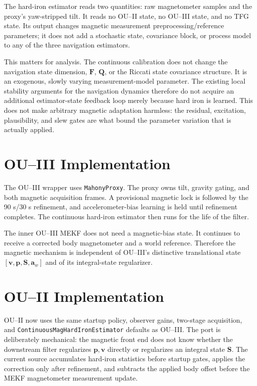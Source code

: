 \documentclass[conference]{IEEEtran}
\DeclareRobustCommand{\vct}[1]{\bm{#1}}
\DeclareRobustCommand{\mat}[1]{\bm{#1}}
\begin{document}
The hard-iron estimator reads two quantities: raw magnetometer samples and the
proxy's yaw-stripped tilt.  It reads no OU--II state, no OU--III state, and no TFG
state.  Its output changes magnetic measurement preprocessing/reference parameters;
it does not add a stochastic state, covariance block, or process model to any of the
three navigation estimators.

This matters for analysis.  The continuous calibration does not change the navigation
state dimension, $\mat F$, $\mat Q$, or the Riccati state covariance structure.  It is
an exogenous, slowly varying measurement-model parameter.  The existing local
stability arguments for the navigation dynamics therefore do not acquire an
additional estimator-state feedback loop merely because hard iron is learned.
This does not make arbitrary magnetic adaptation harmless: the residual, excitation,
plausibility, and slew gates are what bound the parameter variation that is actually
applied.

\section{OU--III Implementation}
\label{sec:ou3}

The OU--III wrapper uses \texttt{MahonyProxy}.  The proxy owns
tilt, gravity gating, and both magnetic acquisition frames.  A provisional magnetic
lock is followed by the 90 s/30 s refinement, and accelerometer-bias learning is held
until refinement completes.  The continuous hard-iron estimator then runs for the
life of the filter.

The inner OU--III MEKF does not need a magnetic-bias state.  It continues to receive a
corrected body magnetometer and a world reference.  Therefore the magnetic mechanism
is independent of OU--III's distinctive translational state
$[\vct v,\vct p,\vct S,\vct a_w]$ and of its integral-state regularizer.

\section{OU--II Implementation}
\label{sec:ou2}

OU--II now uses the same startup policy, observer gains, two-stage acquisition, and
\texttt{ContinuousMagHardIronEstimator} defaults as OU--III.  The port is deliberately
mechanical: the magnetic front end does not know whether the downstream filter
regularizes $\vct p,\vct v$ directly or regularizes an integral state $\vct S$.
The current source accumulates hard-iron statistics before startup gates, applies the
correction only after refinement, and subtracts the applied body offset before the
MEKF magnetometer measurement update.
\end{document}
